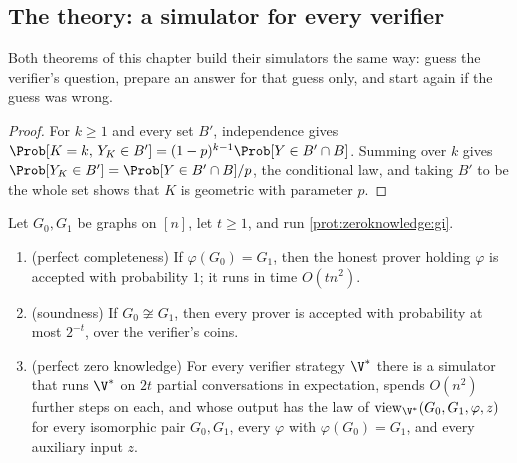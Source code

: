 \begin{refsection}
\section{The theory: a simulator for every verifier}\label{sec:zeroknowledge:gi}

Both theorems of this chapter build their simulators the same way: guess the verifier's question, prepare an answer for that guess only, and start again if the guess was wrong.


\begin{proof}
For $k\ge1$ and every set $B'$, independence gives $\Prob[K=k,\,Y_K\in B']=(1-p)^{k-1}\Prob[Y\in B'\cap B]$. Summing over $k$ gives $\Prob[Y_K\in B']=\Prob[Y\in B'\cap B]/p$, the conditional law, and taking $B'$ to be the whole set shows that $K$ is geometric with parameter $p$.
\end{proof}

\begin{theorem}\label{thm:zeroknowledge:gi}
Let $G_0,G_1$ be graphs on $[n]$, let $t\ge1$, and run \cref{prot:zeroknowledge:gi}.
\begin{enumerate}
\item (perfect completeness) If $\varphi(G_0)=G_1$, then the honest prover holding $\varphi$ is accepted with probability $1$; it runs in time $O(tn^2)$.
\item (soundness) If $G_0\not\cong G_1$, then every prover is accepted with probability at most $2^{-t}$, over the verifier's coins.
\item (perfect zero knowledge) For every verifier strategy $\V^*$ there is a simulator that runs $\V^*$ on $2t$ partial conversations in expectation, spends $O(n^2)$ further steps on each, and whose output has the law of $\zeroknowledgeview_{\V^*}(G_0,G_1,\varphi,z)$ for every isomorphic pair $G_0,G_1$, every $\varphi$ with $\varphi(G_0)=G_1$, and every auxiliary input $z$.
\end{enumerate}
\end{theorem}


\end{refsection}
